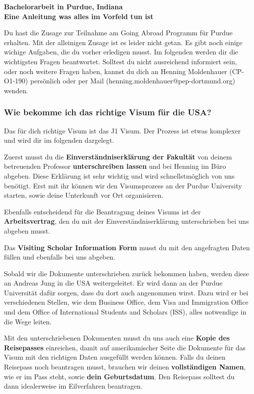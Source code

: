 \documentclass[
  paper=a4,
  fontsize=12pt,
  DIV=16,
  headheight=52pt,
  footheight=45pt,
  headinclude,
  parskip=full,
]{scrartcl}
\date{10. October 2017}
\begin{document}
\textbf{\Huge\sffamily Bachelorarbeit in Purdue, Indiana}\\[0.5\baselineskip]
\textbf{\Large\sffamily Eine Anleitung was alles im Vorfeld tun ist}

Du hast die Zusage zur Teilnahme am Going Abroad Programm für Purdue erhalten.
Mit der alleinigen Zusage ist es leider nicht getan.
Es gibt noch einige wichige Aufgaben, die du vorher erledigen musst.
Im folgenden werden dir die wichtigsten Fragen beantwortet.
Solltest du nicht ausreichend informiert sein, oder noch weitere Fragen haben,
kannst du dich an Henning Moldenhauer (CP-O1-190) persönlich oder per Mail
(henning.moldenhauer@pep-dortmund.org) wenden.

\subsubsection*{Wie bekomme ich das richtige Visum für die USA?}
Das für dich richtige Visum ist das J1 Visum.
Der Prozess ist etwas komplexer und wird dir im folgenden dargelegt.

Zuerst musst du die \textbf{Einverständniserklärung der Fakultät} von deinem
betreuenden Professor \textbf{unterschreiben lassen} und bei Henning im Büro
abgeben.
Diese Erklärung ist sehr wichtig und wird schnellstmöglich von uns benötigt.
Erst mit ihr können wir den Visumsprozess an der Purdue University starten, sowie
deine Unterkunft vor Ort organisieren.

Ebenfalls entscheidend für die Beantragung deines Visums ist der
\textbf{Arbeitsvertrag}, den du mit der Einverständniserklärung unterschrieben
bei uns abgeben musst.

Das \textbf{Visiting Scholar Information Form} musst du mit den angefragten Daten
füllen und ebenfalls bei uns abgeben.

Sobald wir die Dokumente unterschrieben zurück bekommen haben, werden diese an
Andreas Jung in die USA weitergeleitet.
Er wird dann an der Purdue Universität dafür sorgen, dass du dort auch angenommen
wirst. Dazu wird er bei verschiedenen Stellen, wie dem Business Office,
dem Visa and Immigration Office und dem Office of International Students and
Scholars (ISS), alles notwendige in die Wege leiten.

Mit den unterschriebenen Dokumenten musst du uns auch eine
\textbf{Kopie des Reisepasses} einreichen, damit auf amerikamischer Seite die
Dokumente für das Visum mit den richtigen Daten ausgefüllt werden können.
Falls du deinen Reisepass noch beantragen musst, brauchen wir deinen
\textbf{vollständigen Namen}, wie er im Pass steht, sowie \textbf{dein
Geburtsdatum}. Den Reisepass solltest du dann idealerweise im Eilverfahren
beantragen.
\end{document}

